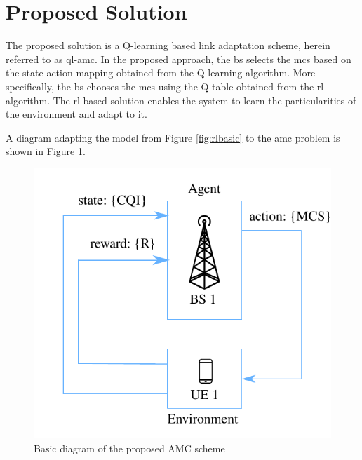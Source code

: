 
\section{Proposed Solution}

The proposed solution is a Q-learning based link adaptation scheme, herein referred to as \gls{ql-amc}.
%
In the proposed approach, the \gls{bs} selects the \gls{mcs} based on the state-action mapping obtained from the Q-learning algorithm.
%
More specifically, the \gls{bs} chooses the \gls{mcs} using the Q-table obtained from the \gls{rl} algorithm.
%
The \gls{rl} based solution enables the system to learn the particularities of the environment and adapt to it.

A diagram adapting the model from Figure \ref{fig:rlbasic} to the \gls{amc} problem is shown in Figure \ref{fig:amc-rl-frame}.
%
\begin{figure}[htb]
\centerline{\includegraphics[width=0.5\columnwidth]{figures/chp_amc/rl-framework-mateus.pdf}}
\caption{Basic diagram of the proposed AMC scheme}
\label{fig:amc-rl-frame}
\end{figure}
%

